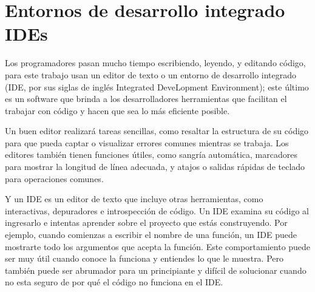 


 


\section{Entornos de desarrollo integrado IDEs}\label{IDEs1}

Los programadores pasan mucho tiempo escribiendo, leyendo, y editando código, para este trabajo usan un editor de texto o un entorno de desarrollo integrado (IDE, por sus siglas de inglés Integrated DeveLopment Environment); este último es un software que brinda a los desarrolladores  herramientas que facilitan el trabajar con código y hacen que sea lo más eficiente posible. 

Un buen editor realizará tareas sencillas, como resaltar la estructura de su código para que pueda captar o visualizar errores comunes mientras se trabaja.  Los editores también tienen funciones útiles,  como sangría automática, marcadores para mostrar la longitud de línea adecuada, y atajos o salidas rápidas de teclado para operaciones comunes. 

Y un IDE es un editor de texto que incluye otras herramientas, como interactivas, depuradores e introspección de código. Un IDE examina su código al ingresarlo  e intentas aprender sobre el proyecto que estás construyendo. Por ejemplo, cuando comienzas a escribir el nombre de una función, un IDE puede mostrarte todo los argumentos que acepta la función. Este comportamiento puede ser muy útil cuando conoce la funciona y entiendes lo que le muestra. Pero  también puede ser abrumador para un principiante y difícil de solucionar cuando no esta seguro de por qué el código no funciona en el IDE.


